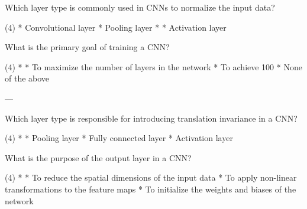 \documentclass[10pt]{extarticle}
\begin{document}
\begin{exercise}
    Which layer type is commonly used in CNNs to normalize the input data?
    \begin{choice} (4)
        * Convolutional layer
        * Pooling layer
        * 
        * Activation layer
    \end{choice}
\end{exercise}
\begin{solution}
\end{solution}

\begin{exercise}
    What is the primary goal of training a CNN?
    \begin{choice} (4)
        * 
        * To maximize the number of layers in the network
        * To achieve 100%
        * None of the above
    \end{choice}
\end{exercise}
\begin{solution}
\end{solution}

---

\begin{exercise}
    Which layer type is responsible for introducing translation invariance in a CNN?
    \begin{choice} (4)
        * 
        * Pooling layer
        * Fully connected layer
        * Activation layer
    \end{choice}
\end{exercise}
\begin{solution}
\end{solution}

\begin{exercise}
    What is the purpose of the output layer in a CNN?
    \begin{choice} (4)
        * 
        * To reduce the spatial dimensions of the input data
        * To apply non-linear transformations to the feature maps
        * To initialize the weights and biases of the network
    \end{choice}
\end{exercise}
\begin{solution}
\end{solution}
\end{document}
